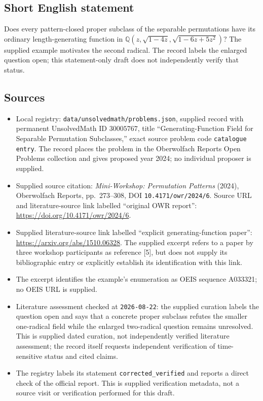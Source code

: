 \documentclass[11pt]{article}
\newcommand{\Q}{\mathbb{Q}}
\begin{document}
\subsection{Short English statement}
Does every pattern-closed proper subclass of the separable permutations have its ordinary length-generating function in \(\Q(z,\sqrt{1-4z},\sqrt{1-6z+5z^2})\)? The supplied example motivates the second radical. The record labels the enlarged question open; this statement-only draft does not independently verify that status.
\subsection{Sources}
\begin{itemize}
\item Local registry: \texttt{data/unsolvedmath/problems.json}, supplied record with permanent UnsolvedMath ID \(30005767\), title ``Generating-Function Field for Separable Permutation Subclasses,'' exact source problem code \texttt{catalogue entry}. The record places the problem in the Oberwolfach Reports Open Problems collection and gives proposed year 2024; no individual proposer is supplied.
\item Supplied source citation: \emph{Mini-Workshop: Permutation Patterns} (2024), Oberwolfach Reports, pp.\ 273--308, DOI \texttt{10.4171/owr/2024/6}. Source URL and literature-source link labelled ``original OWR report'': \url{https://doi.org/10.4171/owr/2024/6}.
\item Supplied literature-source link labelled ``explicit generating-function paper'': \url{https://arxiv.org/abs/1510.06328}. The supplied excerpt refers to a paper by three workshop participants as reference [5], but does not supply its bibliographic entry or explicitly establish its identification with this link.
\item The excerpt identifies the example's enumeration as OEIS sequence A033321; no OEIS URL is supplied.
\item Literature assessment checked at \texttt{2026-08-22}: the supplied curation labels the question open and says that a concrete proper subclass refutes the smaller one-radical field while the enlarged two-radical question remains unresolved. This is supplied dated curation, not independently verified literature assessment; the record itself requests independent verification of time-sensitive status and cited claims.
\item The registry labels its statement \texttt{corrected\_verified} and reports a direct check of the official report. This is supplied verification metadata, not a source visit or verification performed for this draft.
\end{itemize}
\end{document}
